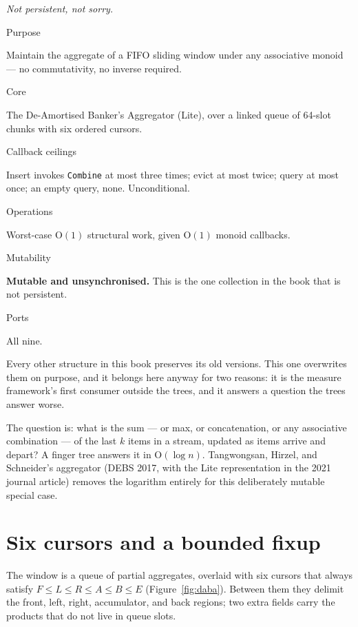 \documentclass[11pt,twoside,openright]{book}
\newcommand{\code}[1]{\texorpdfstring{\textcolor{d7ink}{\texttt{#1}}}{#1}}
\newcommand{\bigoh}[1]{$\mathrm{O}(#1)$}
\newcommand{\motto}[1]{%
  \begingroup
  \vspace{-4pt}\hfill\begin{minipage}{0.80\textwidth}
    \raggedleft\itshape\color{d7slate}\small #1\par
  \end{minipage}\par\vspace{18pt}
  \endgroup}
\newcommand{\spec}[2]{%
  \par\noindent
  \parbox[t]{0.21\linewidth}{\raggedright\sffamily\bfseries\footnotesize
    \color{d7slate}\strut #1}%
  \hspace{9pt}%
  \parbox[t]{\dimexpr0.79\linewidth-9pt\relax}{\raggedright\strut #2}%
  \par\vspace{3.5pt}}
\newenvironment{specimen}[1][Specimen]
  {\begin{glancebox}[#1]\small\setlength{\parindent}{0pt}}
  {\end{glancebox}}
\begin{document}
\motto{Not persistent, not sorry.}

\begin{specimen}[Specimen --- \code{DabaLite}]
\spec{Purpose}{Maintain the aggregate of a FIFO sliding window under any associative monoid --- no commutativity, no inverse required.}
\spec{Core}{The De-Amortised Banker's Aggregator (Lite), over a linked queue of 64-slot chunks with six ordered cursors.}
\spec{Callback ceilings}{Insert invokes \code{Combine} at most three times; evict at most twice; query at most once; an empty query, none. Unconditional.}
\spec{Operations}{Worst-case \bigoh{1} structural work, given \bigoh{1} monoid callbacks.}
\spec{Mutability}{\textbf{Mutable and unsynchronised.} This is the one collection in the book that is not persistent.}
\spec{Ports}{All nine.}
\end{specimen}

\noindent
Every other structure in this book preserves its old versions. This one
overwrites them on purpose, and it belongs here anyway for two reasons: it is the
measure framework's first consumer outside the trees, and it answers a question
the trees answer worse.

The question is: what is the sum --- or max, or concatenation, or any associative
combination --- of the last $k$ items in a stream, updated as items arrive and
depart? A finger tree answers it in \bigoh{\log n}. Tangwongsan, Hirzel, and
Schneider's aggregator (DEBS 2017, with the Lite representation in the 2021
journal article) removes the logarithm entirely for this deliberately mutable
special case.

\section{Six cursors and a bounded fixup}

The window is a queue of partial aggregates, overlaid with six cursors that
always satisfy $F \leq L \leq R \leq A \leq B \leq E$
(Figure~\ref{fig:daba}). Between them they delimit the front, left, right,
accumulator, and back regions; two extra fields carry the products that do not
live in queue slots.
\end{document}
